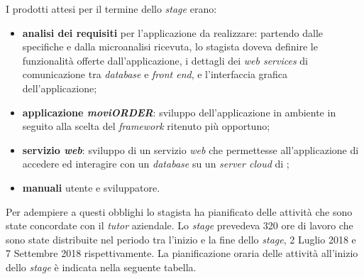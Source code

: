 I prodotti attesi per il termine dello \textit{stage} erano:
\begin{itemize}
	\item \textbf{analisi dei requisiti} per l'applicazione da realizzare: partendo dalle specifiche e dalla microanalisi ricevuta, lo stagista doveva definire le funzionalità offerte dall'applicazione, i dettagli dei \textit{web services} di comunicazione tra \textit{database} e \textit{front end}, e l'interfaccia grafica dell'applicazione;
	\item \textbf{applicazione \textit{moviORDER}}: sviluppo dell'applicazione in ambiente  in seguito alla scelta del \textit{framework} ritenuto più opportuno;
	\item \textbf{servizio \textit{web}}: sviluppo di un servizio \textit{web} che permettesse all'applicazione di accedere ed interagire con un \textit{database} su un \textit{server cloud} di \visione{};
	\item \textbf{manuali} utente e sviluppatore. 
\end{itemize}

Per adempiere a questi obblighi lo stagista ha pianificato delle attività che sono state concordate con il \textit{tutor} aziendale. Lo \textit{stage} prevedeva 320 ore di lavoro che sono state distribuite nel periodo tra l'inizio e la fine dello \textit{stage}, 2 Luglio 2018 e 7 Settembre 2018 rispettivamente. La pianificazione oraria delle attività all'inizio dello \textit{stage} è indicata nella seguente tabella.

